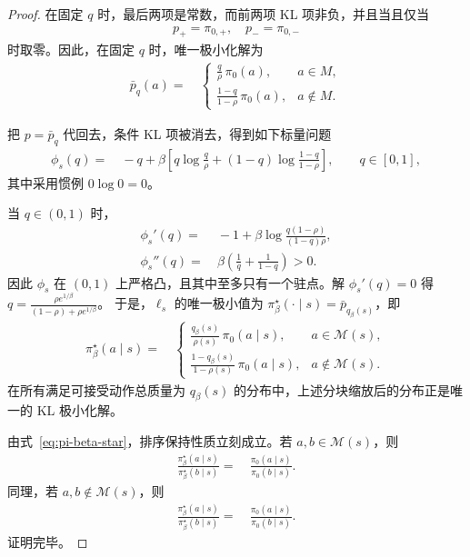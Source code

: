 \begin{proof}
在固定 $q$ 时，最后两项是常数，而前两项 KL 项非负，并且当且仅当
\begin{align*}
p_+= \pi_{0,+}, \quad
p_-= \pi_{0,-}
\end{align*}
时取零。因此，在固定 $q$ 时，唯一极小化解为
\begin{align*}
\bar p_q(a)= &~
\begin{cases}
\displaystyle \frac{q}{\rho}\,\pi_0(a), & a\in M,\\[1.1ex]
\displaystyle \frac{1-q}{1-\rho}\,\pi_0(a), & a\notin M.
\end{cases}
\end{align*}

把 $p=\bar p_q$ 代回去，条件 KL 项被消去，得到如下标量问题
\begin{align*}
\phi_s(q)= &~ -q
+ \beta\left[
q\log\frac{q}{\rho}
+ (1-q)\log\frac{1-q}{1-\rho}
\right],
\qquad q\in[0,1],
\end{align*}
其中采用惯例 $0\log 0 = 0$。

当 $q\in(0,1)$ 时，
\begin{align*}
\phi_s'(q)= &~ -1 + \beta\log\frac{q(1-\rho)}{(1-q)\rho}, \\
\phi_s''(q)= &~ \beta\left(\frac{1}{q}+\frac{1}{1-q}\right) > 0.
\end{align*}
因此 $\phi_s$ 在 $(0,1)$ 上严格凸，且其中至多只有一个驻点。解 $\phi_s'(q)=0$ 得
$q= \frac{\rho e^{1/\beta}}{(1-\rho)+\rho e^{1/\beta}}$。
于是，$\ell_s$ 的唯一极小值为 $\pi_\beta^\star(\cdot\mid s)=\bar p_{q_\beta(s)}$，即
\begin{align}\label{eq:pi-beta-star}
\pi_\beta^\star(a\mid s)= &~
\begin{cases}
\displaystyle \frac{q_\beta(s)}{\rho(s)}\,\pi_0(a\mid s), & a\in \mathcal M(s),\\[1.1ex]
\displaystyle \frac{1-q_\beta(s)}{1-\rho(s)}\,\pi_0(a\mid s), & a\notin \mathcal M(s).
\end{cases}
\end{align}
在所有满足可接受动作总质量为 $q_\beta(s)$ 的分布中，上述分块缩放后的分布正是唯一的 KL 极小化解。

由式~\eqref{eq:pi-beta-star}，排序保持性质立刻成立。若 $a,b\in \mathcal M(s)$，则
\begin{align*}
\frac{\pi_\beta^\star(a\mid s)}{\pi_\beta^\star(b\mid s)}
= &~ \frac{\pi_0(a\mid s)}{\pi_0(b\mid s)}.
\end{align*}
同理，若 $a,b\notin \mathcal M(s)$，则
\begin{align*}
\frac{\pi_\beta^\star(a\mid s)}{\pi_\beta^\star(b\mid s)}
= &~ \frac{\pi_0(a\mid s)}{\pi_0(b\mid s)}.
\end{align*}
证明完毕。
\end{proof}
